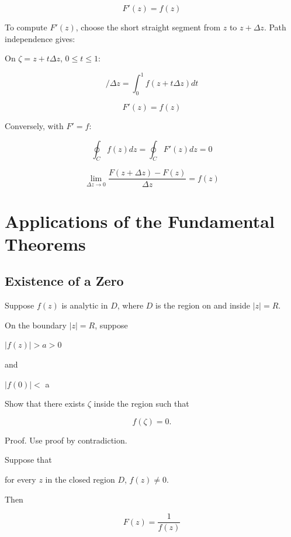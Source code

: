 \documentclass[11pt,a4paper]{article}
\theoremstyle{definition}
\theoremstyle{plain}
\begin{document}
\begin{equation}
F'(z) = f(z)
\end{equation}

To compute $F'(z)$, choose the short straight segment from $z$ to $z + \Delta z$. Path independence gives:

On $\zeta = z + t\Delta z$, $0 \le t \le 1$:

\begin{equation}
[F(z + \Delta z) - F(z)]/\Delta z = \int_{0}^{1}f(z + t\Delta z)dt
\end{equation}

\[
F'(z) = f(z)
\]

Conversely, with $F'= f$:

\begin{equation}
\oint_{C}f(z)dz = \oint_{C}F'(z)dz = 0
\end{equation}

\[
\lim_{\Delta z \to 0}\frac{F(z + \Delta z) - F(z)}{\Delta z} = f(z)
\]

\section{Applications of the Fundamental Theorems}

\subsection{Existence of a Zero}

Suppose $f(z)$ is analytic in $D$, where $D$ is the region on and inside $\vert{}z\vert{} = R$.

On the boundary $\vert{}z\vert{} = R$, suppose

$\vert{}f(z)\vert{} > a > 0$

and

$\vert{}f(0)\vert{} <$ a

Show that there exists $\zeta$ inside the region such that

\begin{equation}
f(\zeta) = 0.
\end{equation}

Proof. Use proof by contradiction.

Suppose that

for every $z$ in the closed region $D$,   $f(z) \ne 0$.

Then

\begin{equation}
F(z) = \frac{1}{f(z)}
\end{equation}
\end{document}
